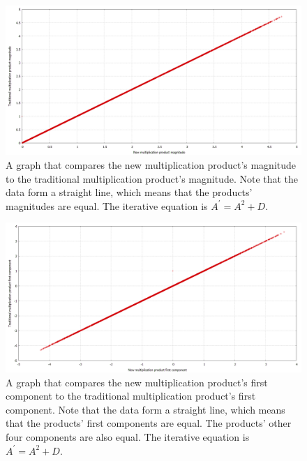 \documentclass[12pt]{article}
\begin{document}
\begin{figure} 
\centering
  \includegraphics[width = 6 in]{a2_magnitude.png}
  \caption{A graph that compares the new multiplication product's magnitude to the traditional multiplication product's magnitude.
Note that the data form a straight line, which means that the products' magnitudes are equal.
The iterative equation is $A^{\prime} = A^2 + D$.
}
\end{figure}


\begin{figure} 
\centering
  \includegraphics[width = 6 in]{a2_first_component.png}
  \caption{A graph that compares the new multiplication product's first component to the traditional multiplication product's first component.
Note that the data form a straight line, which means that the products' first components are equal.
The products' other four components are also equal.
The iterative equation is $A^{\prime} = A^2 + D$.
}
\end{figure}
\end{document}
